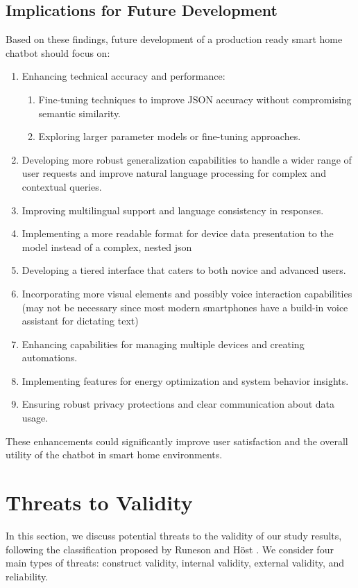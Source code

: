\subsection{Implications for Future Development}
Based on these findings, future development of a production ready smart home chatbot should focus on:
\begin{enumerate}
    \item Enhancing technical accuracy and performance:
    \begin{enumerate}
    \item Fine-tuning techniques to improve JSON accuracy without compromising semantic similarity.
    \item Exploring larger parameter models or fine-tuning approaches.
    \end{enumerate}
    \item Developing more robust generalization capabilities to handle a wider range of user requests and improve natural language processing for complex and contextual queries.
    \item Improving multilingual support and language consistency in responses.
    \item Implementing a more readable format for device data presentation to the model instead of a complex, nested \gls{json}
    \item Developing a tiered interface that caters to both novice and advanced users.
    \item Incorporating more visual elements and possibly voice interaction capabilities (may not be necessary since most modern smartphones have a build-in voice assistant for dictating text)
    \item Enhancing capabilities for managing multiple devices and creating automations.
    \item Implementing features for energy optimization and system behavior insights.
    \item Ensuring robust privacy protections and clear communication about data usage.
    \end{enumerate}

These enhancements could significantly improve user satisfaction and the overall utility of the chatbot in smart home environments.


\section{Threats to Validity}
In this section, we discuss potential threats to the validity of our study results, following the classification proposed by Runeson and Höst \cite{DBLP:journals/ese/RunesonH09}. We consider four main types of threats: construct validity, internal validity, external validity, and reliability.


